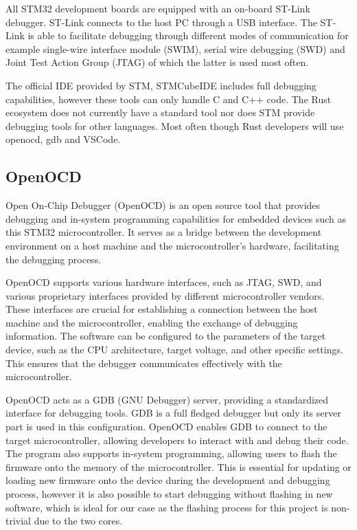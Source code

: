 All STM32 development boards are equipped with an on-board ST-Link debugger. ST-Link connects to the host PC through a USB interface. The ST-Link is able to facilitate debugging through different modes of communication for example single-wire interface module (SWIM), serial wire debugging (SWD) and Joint Test Action Group (JTAG) of which the latter is used most often.

The official IDE provided by STM, STMCubeIDE includes full debugging capabilities, however these tools can only handle C and C++ code. The Rust ecosystem does not currently have a standard tool nor does STM provide debugging tools for other languages. Most often though Rust developers will use openocd, gdb and VSCode.

\subsection{OpenOCD}

Open On-Chip Debugger (OpenOCD) is an open source tool that provides debugging and in-system programming capabilities for embedded devices such as this STM32 microcontroller. It serves as a bridge between the development environment on a host machine and the microcontroller's hardware, facilitating the debugging process.

OpenOCD supports various hardware interfaces, such as JTAG, SWD, and various proprietary interfaces provided by different microcontroller vendors. These interfaces are crucial for establishing a connection between the host machine and the microcontroller, enabling the exchange of debugging information. The software can be configured to the parameters of the target device, such as the CPU architecture, target voltage, and other specific settings. This ensures that the debugger communicates effectively with the microcontroller.

OpenOCD acts as a GDB (GNU Debugger) server, providing a standardized interface for debugging tools. GDB is a full fledged debugger but only its server part is used in this configuration. OpenOCD enables GDB to connect to the target microcontroller, allowing developers to interact with and debug their code. The program also supports in-system programming, allowing users to flash the firmware onto the memory of the microcontroller. This is essential for updating or loading new firmware onto the device during the development and debugging process, however it is also possible to start debugging without flashing in new software, which is ideal for our case as the flashing process for this project is non-trivial due to the two cores.

